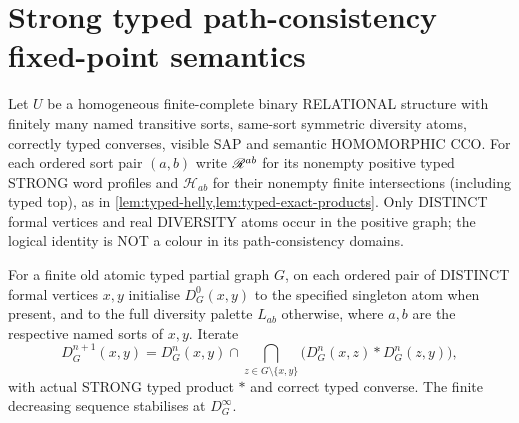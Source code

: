 \section{Strong typed path-consistency fixed-point semantics}
\label{sec:typed-PC-fixedpoint}

Let $U$ be a homogeneous finite-complete binary RELATIONAL structure
with finitely many named transitive sorts, same-sort symmetric
diversity atoms, correctly typed converses, visible SAP and
semantic HOMOMORPHIC CCO. For each ordered sort pair $(a,b)$
write $\mathscr R^{ab}$ for its nonempty positive typed STRONG
word profiles and $\mathcal H_{ab}$ for their nonempty
finite intersections (including typed top), as in
\cref{lem:typed-helly,lem:typed-exact-products}.
Only DISTINCT formal vertices and real DIVERSITY atoms
occur in the positive graph; the logical identity
is NOT a colour in its path-consistency domains.

For a finite old atomic typed partial graph $G$, on
each ordered pair of DISTINCT formal vertices $x,y$
initialise $D^0_G(x,y)$ to the specified singleton
atom when present, and to the full diversity palette
$L_{ab}$ otherwise, where $a,b$ are the
respective named sorts of $x,y$. Iterate
\[
 D^{n+1}_G(x,y)=D^n_G(x,y)\cap
 \bigcap_{z\in G\setminus\{x,y\}}
       \bigl(D^n_G(x,z)*D^n_G(z,y)\bigr),
\]
with actual STRONG typed product $*$ and
correct typed converse. The finite decreasing
sequence stabilises at $D^\infty_G$.

